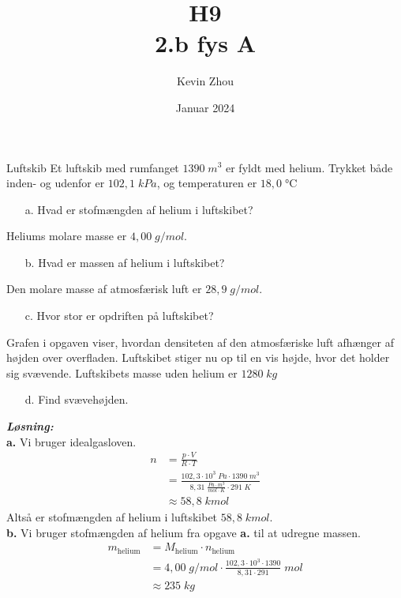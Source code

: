 \documentclass{report}
\title{H9\\
{\Large \textbf{2.b fys A}}}
\author{Kevin Zhou}
\date{Januar 2024}
\newcommand{\sol}{\setlength{\parindent}{0cm}\textbf{\textit{Løsning:}}\setlength{\parindent}{1cm}}
\begin{document}
\maketitle
\begin{question}{Luftskib}{}
  Et luftskib med rumfanget $1390 \;\unit{m^3} $ er fyldt med helium. 
  Trykket både inden- og udenfor er $102,1 \;\unit{kPa}$, og temperaturen er $18,0 \;\unit{\celsius} $ 
  \begin{itemize}
    \item[a.] Hvad er stofmængden af helium i luftskibet?
  \end{itemize}
Heliums molare masse er $4,00 \;\unit{ g/mol}$.
\begin{itemize}
  \item[b.] Hvad er massen af helium i luftskibet?
\end{itemize}
Den molare masse af atmosfærisk luft er $28,9 \;\unit{ g/mol}$.
\begin{itemize}
  \item[c.] Hvor stor er opdriften på luftskibet?
\end{itemize}
Grafen i opgaven viser, hvordan densiteten af den atmosfæriske luft afhænger af højden over overfladen.
Luftskibet stiger nu op til en vis højde, hvor det holder sig svævende. Luftskibets masse uden helium er $1280 \;\unit{ kg}$
\begin{itemize}
  \item[d.] Find svævehøjden.
\end{itemize}
\end{question}
\sol \\ 
\textbf{a.}
Vi bruger idealgasloven.
\begin{equation*}
\begin{split}
  n&=\frac{p\cdot V}{R\cdot T}\\ 
  &=\frac{102,3\cdot 10^3 \;\unit{Pa} \cdot 1390 \;\unit{m^3} }{8,31 \;\unit{\frac{Pa \cdot m^3}{mol\cdot K}}\cdot 291 \;\unit{K} }\\ 
  &\approx 58,8 \;\unit{kmol} 
\end{split}
\end{equation*}
Altså er stofmængden af helium i luftskibet $58,8 \;\unit{kmol} $. \\[1ex]
\textbf{b.}
Vi bruger stofmængden af helium fra opgave \textbf{a.} til at udregne massen.
\begin{equation*}
\begin{split}
  m_{\text{helium} }&=M_{\text{helium} }\cdot n_{\text{helium} }\\ 
  &=4,00 \;\unit{g/mol} \cdot \frac{102,3\cdot 10^3  \cdot 1390 }{{8,31 }\cdot 291 }\;\unit{mol} \\ 
  &\approx 235 \;\unit{kg} 
\end{split}
\end{equation*}
\end{document}
